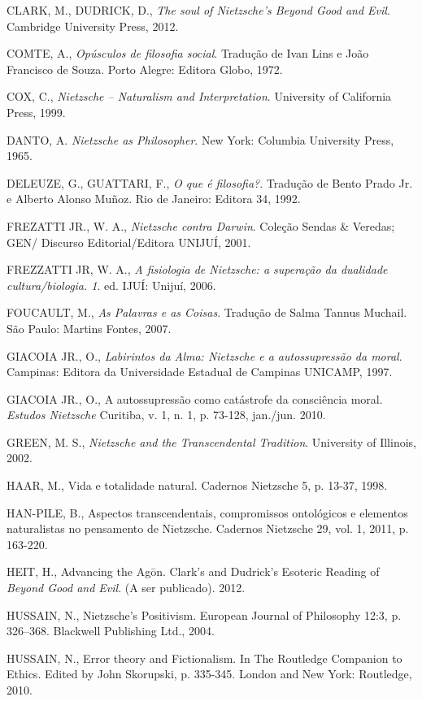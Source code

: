 \documentclass[
	12pt,				%
	openright,			%
	oneside,			%
	a4paper,			%
	english,			%
	french,				%
	spanish,			%
	brazil				%
	]{abntex2}
\begin{document}
CLARK, M., DUDRICK, D., \textit{The soul of Nietzsche's Beyond Good and Evil}. Cambridge University Press, 2012.

COMTE, A., \textit{Opúsculos de filosofia social}. Tradução de Ivan Lins e João Francisco de Souza. Porto Alegre: Editora Globo, 1972. 

COX, C., \textit{Nietzsche – Naturalism and Interpretation}. University of California Press, 1999.

DANTO, A. \textit{Nietzsche as Philosopher}. New York: Columbia University Press, 1965.

DELEUZE, G., GUATTARI, F., \textit{O que é filosofia?}. Tradução de Bento Prado Jr. e Alberto Alonso Muñoz. Rio de Janeiro: Editora 34, 1992.

FREZATTI JR., W. A., \textit{Nietzsche contra Darwin}. Coleção Sendas \& Veredas; GEN/ Discurso Editorial/Editora UNIJUÍ, 2001.

FREZZATTI JR, W. A., \textit{A fisiologia de Nietzsche: a superação da dualidade cultura/biologia. 1}. ed. IJUÍ: Unijuí, 2006. 

FOUCAULT, M., \textit{As Palavras e as Coisas}. Tradução de Salma Tannus Muchail. São Paulo: Martins Fontes, 2007.

GIACOIA JR., O., \textit{Labirintos da Alma: Nietzsche e a autossupressão da moral}. Campinas: Editora da Universidade Estadual de Campinas UNICAMP, 1997.

GIACOIA JR., O., A autossupressão como catástrofe da consciência moral. \textit{Estudos Nietzsche} Curitiba, v. 1, n. 1, p. 73-128, jan./jun. 2010.

GREEN, M. S., \textit{Nietzsche and the Transcendental Tradition}. University of Illinois, 2002. 

HAAR, M., Vida e totalidade natural. Cadernos Nietzsche 5, p. 13-37, 1998.

HAN-PILE, B., Aspectos transcendentais, compromissos ontológicos e elementos naturalistas no pensamento de Nietzsche. Cadernos Nietzsche 29, vol. 1, 2011, p. 163-220. 

HEIT, H., Advancing the Ag\={o}n. Clark’s and Dudrick’s Esoteric Reading of \textit{Beyond Good and Evil}. (A ser publicado). 2012.

HUSSAIN, N., Nietzsche's Positivism. European Journal of Philosophy 12:3, p. 326–368. Blackwell Publishing Ltd., 2004.

HUSSAIN, N., Error theory and Fictionalism. In The Routledge Companion to Ethics. Edited by John Skorupski, p. 335-345. London and New York: Routledge, 2010.
\end{document}
